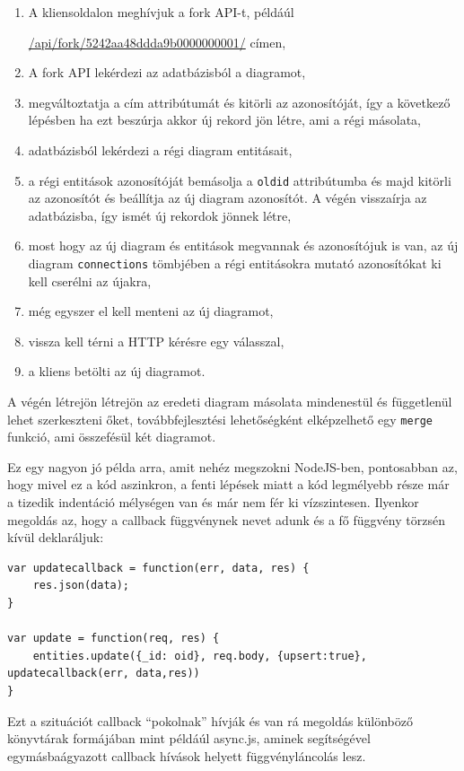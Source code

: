 \begin{enumerate}
\item A kliensoldalon meghívjuk a fork API-t, példáúl 

\url{/api/fork/5242aa48ddda9b0000000001/} címen,
\item A fork API lekérdezi az adatbázisból a diagramot,
\item megváltoztatja a cím  attribútumát és kitörli az azonosítóját, így a következő lépésben ha ezt beszúrja akkor új rekord jön létre, ami a régi másolata,
\item adatbázisból lekérdezi a régi diagram entitásait, 
\item a régi entitások azonosítóját bemásolja a \lstinline{oldid} attribútumba és majd kitörli az azonosítót és beállítja az új diagram azonosítót. A végén visszaírja az adatbázisba, így ismét új rekordok jönnek létre,
\item most hogy az új diagram és entitások megvannak és azonosítójuk is van, az új diagram \lstinline{connections} tömbjében a régi entitásokra mutató azonosítókat ki kell cserélni az újakra,
\item még egyszer el kell menteni az új diagramot,
\item vissza kell térni a HTTP kérésre egy válasszal,
\item a kliens betölti az új diagramot.
\end{enumerate}


A végén létrejön létrejön az eredeti diagram másolata mindenestül és függetlenül lehet szerkeszteni őket, továbbfejlesztési lehetőségként elképzelhető egy \lstinline{merge} funkció, ami összefésül két diagramot. 

Ez egy nagyon jó példa arra, amit nehéz megszokni NodeJS-ben, pontosabban az, hogy mivel ez a kód aszinkron, a fenti lépések miatt a kód legmélyebb része már a tizedik indentáció mélységen van és már nem fér ki vízszintesen. Ilyenkor megoldás az, hogy a callback függvénynek nevet adunk és a fő függvény törzsén kívül deklaráljuk:

\begin{lstlisting}[caption=callback pokol megoldása]
var updatecallback = function(err, data, res) {
    res.json(data);
}

var update = function(req, res) {
    entities.update({_id: oid}, req.body, {upsert:true}, updatecallback(err, data,res))
}
\end{lstlisting}

Ezt a szituációt callback ``pokolnak'' hívják és van rá megoldás különböző könyvtárak formájában mint példáúl async.js, aminek segítségével egymásbaágyazott callback hívások helyett függvényláncolás lesz.

